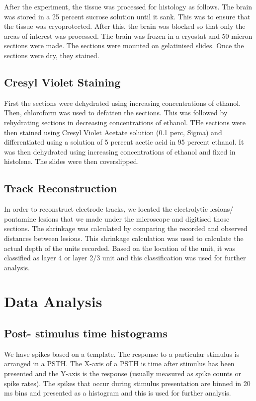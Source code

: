 After the experiment, the tissue was processed for histology as follows. The brain was stored in a 25 percent sucrose solution until it sank. This was to ensure that the tissue was cryoprotected. After this, the brain was blocked so that only the areas of interest was processed. The brain was frozen in a cryostat and 50 micron sections were made. The sections were mounted on gelatinised slides. Once the sections were dry, they stained.

\subsection{Cresyl Violet Staining}

First the sections were dehydrated using increasing concentrations of ethanol. Then, chloroform was used to defatten the sections. This was followed by rehydrating sections in decreasing concentrations of ethanol. THe sections were then stained using Cresyl Violet Acetate solution (0.1 perc, Sigma) and differentiated using a solution of 5 percent acetic acid in 95 percent ethanol. It was then dehydrated using increasing concentrations of ethanol and fixed in histolene. The slides were then coverslipped.

\subsection{Track Reconstruction}

In order to reconstruct electrode tracks, we located the electrolytic lesions/ pontamine lesions that we made under the microscope and digitised those sections. The shrinkage was calculated by comparing the recorded and observed distances between lesions. This shrinkage calculation was used to calculate the actual depth of the units recorded. Based on the location of the unit, it was classified as layer 4 or layer 2/3 unit and this classification was used for further analysis.

\section{Data Analysis}
	\subsection{Post- stimulus time histograms}

		We have spikes based on a template. The response to a particular stimulus is arranged in a PSTH. The X-axis of a PSTH is time after stimulus has been presented and the Y-axis is the response (usually measured as spike counts or spike rates). The spikes that occur during stimulus presentation are binned in 20 ms bins and presented as a histogram and this is used for further analysis.

